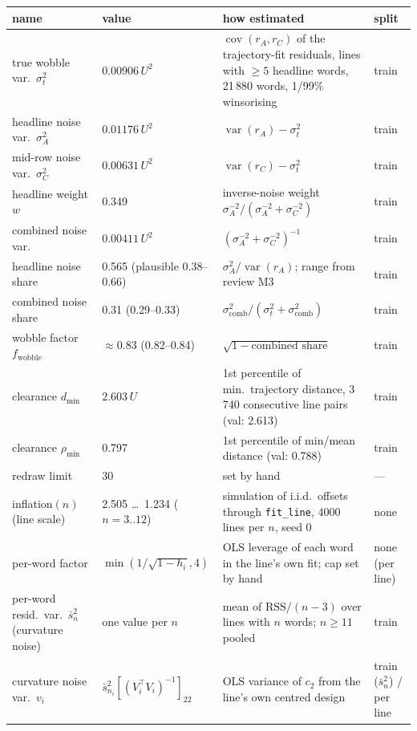 \documentclass[11pt,a4paper]{article}
\newcommand{\U}{\ensuremath{U}}
\begin{document}
\begin{table}[H]\centering\small
\begin{tabular}{p{3.6cm}p{2.7cm}p{6.1cm}p{1.8cm}}
\toprule
name & value & how estimated & split\\
\midrule
true wobble var.\ $\sigma_t^2$ & $0.00906\,\U^2$ & $\operatorname{cov}(r_A,r_C)$ of the trajectory-fit residuals, lines with $\ge5$ headline words, 21\,880 words, 1/99\% winsorising & train\\
headline noise var.\ $\sigma_A^2$ & $0.01176\,\U^2$ & $\operatorname{var}(r_A)-\sigma_t^2$ & train\\
mid-row noise var.\ $\sigma_C^2$ & $0.00631\,\U^2$ & $\operatorname{var}(r_C)-\sigma_t^2$ & train\\
headline weight $w$ & 0.349 & inverse-noise weight $\sigma_A^{-2}/(\sigma_A^{-2}+\sigma_C^{-2})$ & train\\
combined noise var. & $0.00411\,\U^2$ & $(\sigma_A^{-2}+\sigma_C^{-2})^{-1}$ & train\\
headline noise share & 0.565 (plausible 0.38--0.66) & $\sigma_A^2/\operatorname{var}(r_A)$; range from review M3 & train\\
combined noise share & 0.31 (0.29--0.33) & $\sigma^2_\text{comb}/(\sigma_t^2+\sigma^2_\text{comb})$ & train\\
wobble factor $f_\text{wobble}$ & $\approx0.83$ (0.82--0.84) & $\sqrt{1-\text{combined share}}$ & train\\
clearance $d_\text{min}$ & $2.603\,\U$ & 1st percentile of min.\ trajectory distance, 3\,740 consecutive line pairs (val: 2.613) & train\\
clearance $\rho_\text{min}$ & 0.797 & 1st percentile of min/mean distance (val: 0.788) & train\\
redraw limit & 30 & set by hand & ---\\
inflation$(n)$ (line scale) & 2.505 \ldots\ 1.234 ($n=3..12$) & simulation of i.i.d.\ offsets through \texttt{fit\_line}, 4000 lines per $n$, seed 0 & none\\
per-word factor & $\min(1/\sqrt{1-h_i},4)$ & OLS leverage of each word in the line's own fit; cap set by hand & none (per line)\\
per-word resid.\ var.\ $\bar s^2_n$ (curvature noise) & one value per $n$ & mean of $\text{RSS}/(n-3)$ over lines with $n$ words; $n\ge11$ pooled & train\\
curvature noise var.\ $v_i$ & $\bar s^2_{n_i}[(V_i^\top V_i)^{-1}]_{22}$ & OLS variance of $c_2$ from the line's own centred design & train ($\bar s^2_n$) / per line\\

\end{tabular}
\end{table}
\end{document}
